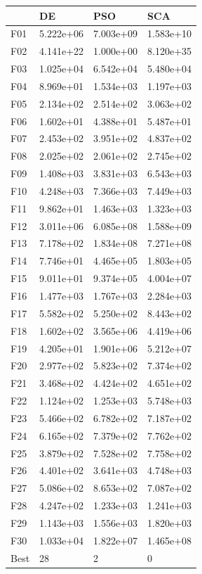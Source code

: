 \begin{tabular}{llll}
\toprule
{} &         DE &        PSO &        SCA \\
\midrule
F01  &  5.222e+06 &  7.003e+09 &  1.583e+10 \\
F02  &  4.141e+22 &  1.000e+00 &  8.120e+35 \\
F03  &  1.025e+04 &  6.542e+04 &  5.480e+04 \\
F04  &  8.969e+01 &  1.534e+03 &  1.197e+03 \\
F05  &  2.134e+02 &  2.514e+02 &  3.063e+02 \\
F06  &  1.602e+01 &  4.388e+01 &  5.487e+01 \\
F07  &  2.453e+02 &  3.951e+02 &  4.837e+02 \\
F08  &  2.025e+02 &  2.061e+02 &  2.745e+02 \\
F09  &  1.408e+03 &  3.831e+03 &  6.543e+03 \\
F10  &  4.248e+03 &  7.366e+03 &  7.449e+03 \\
F11  &  9.862e+01 &  1.463e+03 &  1.323e+03 \\
F12  &  3.011e+06 &  6.085e+08 &  1.588e+09 \\
F13  &  7.178e+02 &  1.834e+08 &  7.271e+08 \\
F14  &  7.746e+01 &  4.465e+05 &  1.803e+05 \\
F15  &  9.011e+01 &  9.374e+05 &  4.004e+07 \\
F16  &  1.477e+03 &  1.767e+03 &  2.284e+03 \\
F17  &  5.582e+02 &  5.250e+02 &  8.443e+02 \\
F18  &  1.602e+02 &  3.565e+06 &  4.419e+06 \\
F19  &  4.205e+01 &  1.901e+06 &  5.212e+07 \\
F20  &  2.977e+02 &  5.823e+02 &  7.374e+02 \\
F21  &  3.468e+02 &  4.424e+02 &  4.651e+02 \\
F22  &  1.124e+02 &  1.253e+03 &  5.748e+03 \\
F23  &  5.466e+02 &  6.782e+02 &  7.187e+02 \\
F24  &  6.165e+02 &  7.379e+02 &  7.762e+02 \\
F25  &  3.879e+02 &  7.528e+02 &  7.758e+02 \\
F26  &  4.401e+02 &  3.641e+03 &  4.748e+03 \\
F27  &  5.086e+02 &  8.653e+02 &  7.087e+02 \\
F28  &  4.247e+02 &  1.233e+03 &  1.241e+03 \\
F29  &  1.143e+03 &  1.556e+03 &  1.820e+03 \\
F30  &  1.033e+04 &  1.822e+07 &  1.465e+08 \\
Best &         28 &          2 &          0 \\
\bottomrule
\end{tabular}
